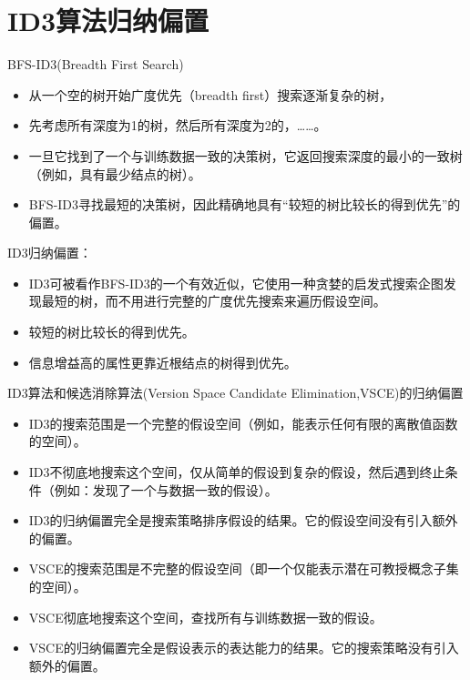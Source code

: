 \documentclass[presentation]{beamer}
\begin{document}
\section{ID3算法归纳偏置}
\label{sec:org1acc801}

\begin{frame}[label={sec:org7baad4d}]{BFS-ID3(Breadth First Search)}
\begin{itemize}
\item 从一个空的树开始广度优先（breadth first）搜索逐渐复杂的树，
\item 先考虑所有深度为1的树，然后所有深度为2的，……。
\item 一旦它找到了一个与训练数据一致的决策树，它返回搜索深度的最小的一致树（例如，具有最少结点的树）。
\item BFS-ID3寻找最短的决策树，因此精确地具有“较短的树比较长的得到优先”的偏置。
\end{itemize}
\end{frame}
\begin{frame}[label={sec:orgce72d99}]{ID3归纳偏置：}
\begin{itemize}
\item ID3可被看作BFS-ID3的一个有效近似，它使用一种贪婪的启发式搜索企图发现最短的树，而不用进行完整的广度优先搜索来遍历假设空间。
\item 较短的树比较长的得到优先。
\item 信息增益高的属性更靠近根结点的树得到优先。
\end{itemize}
\end{frame}
\begin{frame}[label={sec:org2b8e387}]{ID3算法和候选消除算法(Version Space Candidate Elimination,VSCE)的归纳偏置}
\begin{itemize}
\item ID3的搜索范围是一个完整的假设空间（例如，能表示任何有限的离散值函数的空间）。
\item ID3不彻底地搜索这个空间，仅从简单的假设到复杂的假设，然后遇到终止条件（例如：发现了一个与数据一致的假设）。
\item ID3的归纳偏置完全是搜索策略排序假设的结果。它的假设空间没有引入额外的偏置。
\item VSCE的搜索范围是不完整的假设空间（即一个仅能表示潜在可教授概念子集的空间）。
\item VSCE彻底地搜索这个空间，查找所有与训练数据一致的假设。
\item VSCE的归纳偏置完全是假设表示的表达能力的结果。它的搜索策略没有引入额外的偏置。
\end{itemize}
\end{frame}
\end{document}
